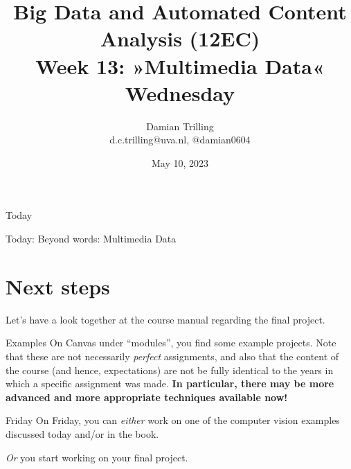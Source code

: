 

\graphicspath{{../../resources/img/}}




\title[Big Data and Automated Content Analysis]{\textbf{Big Data and Automated Content Analysis (12EC)} 
\\Week 13: »Multimedia Data«
\\Wednesday}
\author[Damian Trilling]{Damian Trilling\\ \footnotesize{d.c.trilling@uva.nl, @damian0604 \\}}
\date{May 10, 2023}


\begin{frame}{}
	\titlepage
\end{frame}

\begin{frame}{Today}
	\tableofcontents
\end{frame}


\begin{frame}[standout]
Today: Beyond words: Multimedia Data
\end{frame}









\section{Next steps}
\begin{frame}[standout]
Let's have a look together at the course manual regarding the final project.
\end{frame}

\begin{frame}{Examples}
On Canvas under ``modules'', you find some example projects. Note that these are not necessarily \emph{perfect} assignments, and also that the content of the course (and hence, expectations) are not be fully identical to the years in which a specific assignment was made. \textbf{In particular, there may be more advanced and more appropriate techniques available now!}
\end{frame}

\begin{frame}{Friday}
On Friday, you can \emph{either} work on one of the computer vision examples discussed today and/or in the book.

\emph{Or} you start working on your final project.

\end{frame}


\begin{frame}
\printbibliography
\end{frame}




